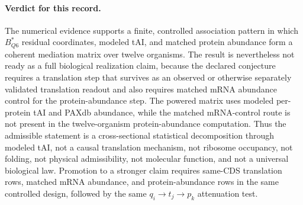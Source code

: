 \paragraph{Verdict for this record.}
The numerical evidence supports a finite, controlled association pattern in which $B^{\ast}_{Q6}$ residual coordinates, modeled tAI, and matched protein abundance form a coherent mediation matrix over twelve organisms.  The result is nevertheless not ready as a full biological realization claim, because the declared conjecture requires a translation step that survives as an observed or otherwise separately validated translation readout and also requires matched mRNA abundance control for the protein-abundance step.  The powered matrix uses modeled per-protein tAI and PAXdb abundance, while the matched mRNA-control route is not present in the twelve-organism protein-abundance computation.  Thus the admissible statement is a cross-sectional statistical decomposition through modeled tAI, not a causal translation mechanism, not ribosome occupancy, not folding, not physical admissibility, not molecular function, and not a universal biological law.  Promotion to a stronger claim requires same-CDS translation rows, matched mRNA abundance, and protein-abundance rows in the same controlled design, followed by the same $q_i \to t_j \to p_k$ attenuation test.
